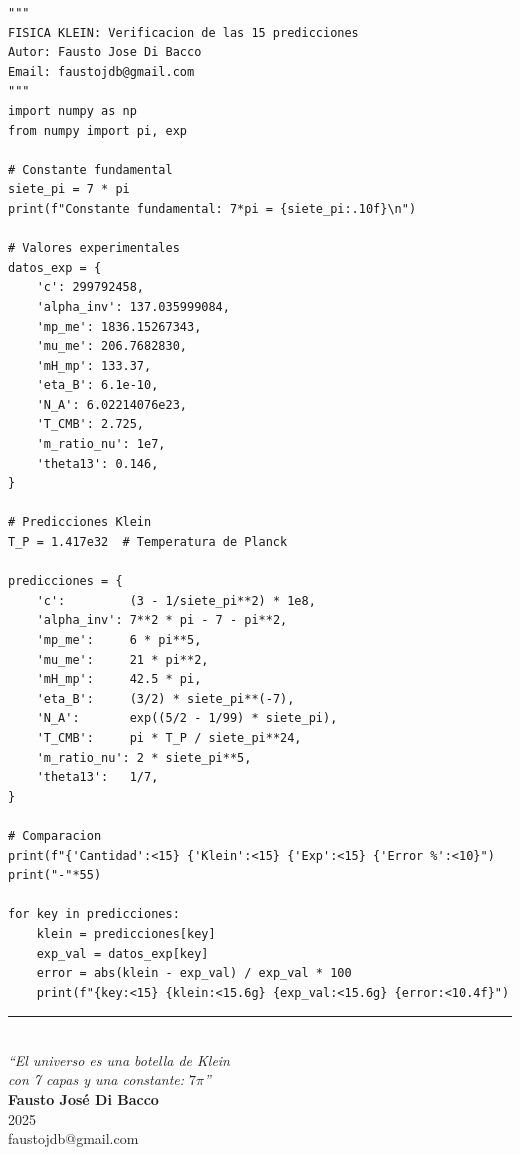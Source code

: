 \documentclass[12pt,a4paper,openany]{book}
\begin{document}
\begin{lstlisting}[caption={Verificación de las 15 predicciones de Klein}]
"""
FISICA KLEIN: Verificacion de las 15 predicciones
Autor: Fausto Jose Di Bacco
Email: faustojdb@gmail.com
"""
import numpy as np
from numpy import pi, exp

# Constante fundamental
siete_pi = 7 * pi
print(f"Constante fundamental: 7*pi = {siete_pi:.10f}\n")

# Valores experimentales
datos_exp = {
    'c': 299792458,
    'alpha_inv': 137.035999084,
    'mp_me': 1836.15267343,
    'mu_me': 206.7682830,
    'mH_mp': 133.37,
    'eta_B': 6.1e-10,
    'N_A': 6.02214076e23,
    'T_CMB': 2.725,
    'm_ratio_nu': 1e7,
    'theta13': 0.146,
}

# Predicciones Klein
T_P = 1.417e32  # Temperatura de Planck

predicciones = {
    'c':         (3 - 1/siete_pi**2) * 1e8,
    'alpha_inv': 7**2 * pi - 7 - pi**2,
    'mp_me':     6 * pi**5,
    'mu_me':     21 * pi**2,
    'mH_mp':     42.5 * pi,
    'eta_B':     (3/2) * siete_pi**(-7),
    'N_A':       exp((5/2 - 1/99) * siete_pi),
    'T_CMB':     pi * T_P / siete_pi**24,
    'm_ratio_nu': 2 * siete_pi**5,
    'theta13':   1/7,
}

# Comparacion
print(f"{'Cantidad':<15} {'Klein':<15} {'Exp':<15} {'Error %':<10}")
print("-"*55)

for key in predicciones:
    klein = predicciones[key]
    exp_val = datos_exp[key]
    error = abs(klein - exp_val) / exp_val * 100
    print(f"{key:<15} {klein:<15.6g} {exp_val:<15.6g} {error:<10.4f}")
\end{lstlisting}


\vfill
\begin{center}
\rule{0.6\textwidth}{1pt}\\[1cm]
{\Large\itshape ``El universo es una botella de Klein\\
con 7 capas y una constante: $7\pi$''}\\[1cm]
\textbf{Fausto José Di Bacco}\\
2025\\[0.5cm]
faustojdb@gmail.com
\end{center}
\end{document}
